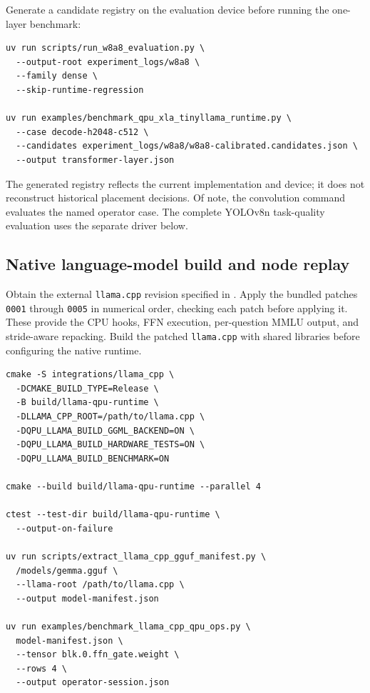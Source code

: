 \documentclass[sigplan,screen,review]{acmart}
\begin{document}
Generate a candidate registry on the evaluation device before running
the one-layer benchmark:
{\footnotesize
\begin{verbatim}
uv run scripts/run_w8a8_evaluation.py \
  --output-root experiment_logs/w8a8 \
  --family dense \
  --skip-runtime-regression

uv run examples/benchmark_qpu_xla_tinyllama_runtime.py \
  --case decode-h2048-c512 \
  --candidates experiment_logs/w8a8/w8a8-calibrated.candidates.json \
  --output transformer-layer.json
\end{verbatim}
}
The generated registry reflects the current implementation and device;
it does not reconstruct historical placement decisions. Of note, the convolution command evaluates the named operator case. The complete YOLOv8n task-quality evaluation uses the separate driver below.

\subsection{Native language-model build and node replay}

Obtain the external \texttt{llama.cpp} revision specified in . Apply the bundled patches \texttt{0001} through \texttt{0005} in numerical order, checking each
patch before applying it. These provide the CPU hooks, FFN execution,
per-question MMLU output, and stride-aware repacking. Build the patched
\texttt{llama.cpp} with shared libraries before configuring the native
runtime.

{\footnotesize
\begin{verbatim}
cmake -S integrations/llama_cpp \
  -DCMAKE_BUILD_TYPE=Release \
  -B build/llama-qpu-runtime \
  -DLLAMA_CPP_ROOT=/path/to/llama.cpp \
  -DQPU_LLAMA_BUILD_GGML_BACKEND=ON \
  -DQPU_LLAMA_BUILD_HARDWARE_TESTS=ON \
  -DQPU_LLAMA_BUILD_BENCHMARK=ON

cmake --build build/llama-qpu-runtime --parallel 4

ctest --test-dir build/llama-qpu-runtime \
  --output-on-failure
  
uv run scripts/extract_llama_cpp_gguf_manifest.py \
  /models/gemma.gguf \
  --llama-root /path/to/llama.cpp \
  --output model-manifest.json

uv run examples/benchmark_llama_cpp_qpu_ops.py \
  model-manifest.json \
  --tensor blk.0.ffn_gate.weight \
  --rows 4 \
  --output operator-session.json
\end{verbatim}
}
\end{document}

